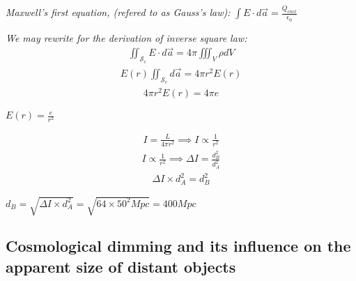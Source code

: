 \documentclass{article}
\begin{document}
\begin{center}
\textit{Maxwell's first equation, (refered to as Gauss's law):}
$\boxed{\int E \cdot d\vec{a}  = \frac{Q_{encl}}{\epsilon_0}}
$

\end{center} 
\textit{We may rewrite for the derivation of inverse square law: }
\begin{gather}
\iint_{\mathcal{S}_c} E \cdot d\vec{a} = 4\pi \iiint_V \rho dV 
\end{gather}
\begin{gather}
E(r) \iint_{\mathcal{S}_c} d\vec{a} = 4\pi r^2 E(r)
\end{gather}
\begin{gather}
4\pi r^2 E(r) = 4\pi e
\end{gather}
\begin{center}
	$\boxed{E(r) = \frac{e}{r^2}}$
	
\end{center}



	\begin{gather*}
	I = \frac{L}{4\pi r^2} \implies I \propto \frac{1}{r^2}
	\end{gather*}
\begin{gather*}
	I \propto \frac{1}{r^2} \implies \Delta I = \frac{d_{B}^2}{d_{A}^2}
\end{gather*}
\begin{gather*}
\Delta I \times d^2_A = d^2_B
\end{gather*}
\begin{center}
$\boxed{ d_B = \sqrt{\Delta I \times d^2_A} = \sqrt{64 \times 50^2Mpc} = 400Mpc}
$
\end{center}

\subsection{Cosmological dimming and its influence on the apparent size of distant objects}
\end{document}
